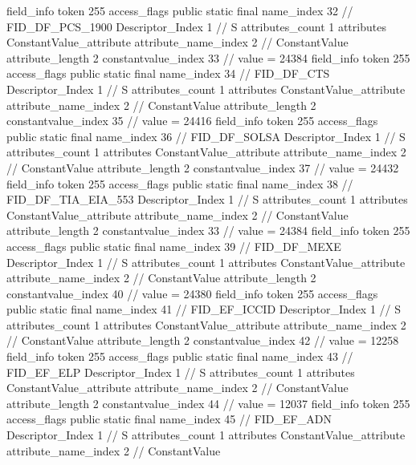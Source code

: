 {{{{{{{				}
				}
			}
			field_info {
				token	255
				access_flags	public static final
				name_index	32		// FID_DF_PCS_1900
				Descriptor_Index	1		// S
				attributes_count	1
				attributes {
				ConstantValue_attribute {
					attribute_name_index	2		// ConstantValue
					attribute_length	2
					constantvalue_index	33		// value = 24384
				}
				}
			}
			field_info {
				token	255
				access_flags	public static final
				name_index	34		// FID_DF_CTS
				Descriptor_Index	1		// S
				attributes_count	1
				attributes {
				ConstantValue_attribute {
					attribute_name_index	2		// ConstantValue
					attribute_length	2
					constantvalue_index	35		// value = 24416
				}
				}
			}
			field_info {
				token	255
				access_flags	public static final
				name_index	36		// FID_DF_SOLSA
				Descriptor_Index	1		// S
				attributes_count	1
				attributes {
				ConstantValue_attribute {
					attribute_name_index	2		// ConstantValue
					attribute_length	2
					constantvalue_index	37		// value = 24432
				}
				}
			}
			field_info {
				token	255
				access_flags	public static final
				name_index	38		// FID_DF_TIA_EIA_553
				Descriptor_Index	1		// S
				attributes_count	1
				attributes {
				ConstantValue_attribute {
					attribute_name_index	2		// ConstantValue
					attribute_length	2
					constantvalue_index	33		// value = 24384
				}
				}
			}
			field_info {
				token	255
				access_flags	public static final
				name_index	39		// FID_DF_MEXE
				Descriptor_Index	1		// S
				attributes_count	1
				attributes {
				ConstantValue_attribute {
					attribute_name_index	2		// ConstantValue
					attribute_length	2
					constantvalue_index	40		// value = 24380
				}
				}
			}
			field_info {
				token	255
				access_flags	public static final
				name_index	41		// FID_EF_ICCID
				Descriptor_Index	1		// S
				attributes_count	1
				attributes {
				ConstantValue_attribute {
					attribute_name_index	2		// ConstantValue
					attribute_length	2
					constantvalue_index	42		// value = 12258
				}
				}
			}
			field_info {
				token	255
				access_flags	public static final
				name_index	43		// FID_EF_ELP
				Descriptor_Index	1		// S
				attributes_count	1
				attributes {
				ConstantValue_attribute {
					attribute_name_index	2		// ConstantValue
					attribute_length	2
					constantvalue_index	44		// value = 12037
				}
				}
			}
			field_info {
				token	255
				access_flags	public static final
				name_index	45		// FID_EF_ADN
				Descriptor_Index	1		// S
				attributes_count	1
				attributes {
				ConstantValue_attribute {
					attribute_name_index	2		// ConstantValue
}}}}}}}
